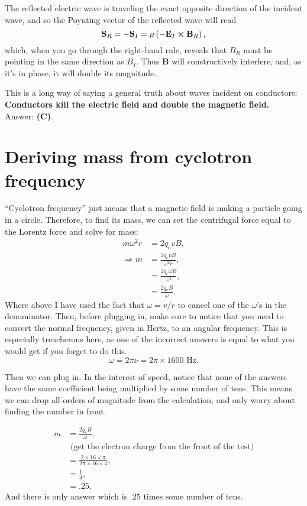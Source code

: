 \documentclass[11pt]{paper}
\newcommand{\answer}[1]{Answer: \textbf{(#1)}.}
\begin{document}
The reflected electric wave is traveling the exact opposite direction of the incident wave, and so the Poynting vector of the reflected wave will read
\begin{equation}
\mathbf{S}_R = -\mathbf{S}_I = \mu\left(-\mathbf{E}_I\cross\mathbf{B}_R\right),
\end{equation}
which, when you go through the right-hand rule, reveals that $B_R$ must be pointing in the same direction as $B_I$.  Thus $\mathbf{B}$ will constructively interfere, and, as it's in phase, it will double its magnitude.

This is a long way of saying a general truth about waves incident on conductors: \textbf{Conductors kill the electric field and double the magnetic field.}\\

\answer{C}

\section{Deriving mass from cyclotron frequency}
``Cyclotron frequency'' just means that a magnetic field is making a particle going in a circle.  Therefore, to find its mass, we can set the centrifugal force equal to the Lorentz force and solve for mass:
\begin{align}
m\omega^2 r &= 2q_evB,\\
\Rightarrow m &= \frac{2q_evB}{\omega^2 r},\\
&= \frac{2q_e\omega B}{\omega^2},\\
&= \frac{2q_eB}{\omega}.
\end{align}
Where above I have used the fact that $\omega = v/r$ to cancel one of the $\omega$'s in the denominator.  Then, before plugging in, make sure to notice that you need to convert the normal frequency, given in Hertz, to an angular frequency.  This is especially treacherous here, as one of the incorrect answers is equal to what you would get if you forget to do this.
\begin{equation}
\omega = 2\pi \nu = 2\pi\times1600\text{ Hz}.
\end{equation}

Then we can plug in.  In the interest of speed, notice that none of the answers have the same coefficient being multiplied by some number of tens.  This means we can drop all orders of magnitude from the calculation, and only worry about finding the number in front.

\begin{align}
m &= \frac{2q_eB}{\omega},\\
&\text{ (get the electron charge from the front of the test)}\\
&= \frac{2\times 16 \times \pi}{2\pi \times 16 \times 4},\\
&= \frac{1}{4},\\
&= .25.
\end{align}
And there is only answer which is $.25$ times some number of tens.\\
\end{document}
